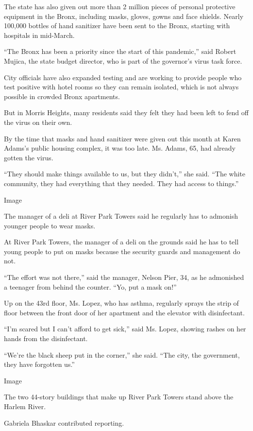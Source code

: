 The state has also given out more than 2 million pieces of personal
protective equipment in the Bronx, including masks, gloves, gowns and
face shields. Nearly 100,000 bottles of hand sanitizer have been sent to
the Bronx, starting with hospitals in mid-March.

``The Bronx has been a priority since the start of this pandemic,'' said
Robert Mujica, the state budget director, who is part of the governor's
virus task force.

City officials have also expanded testing and are working to provide
people who test positive with hotel rooms so they can remain isolated,
which is not always possible in crowded Bronx apartments.

But in Morris Heights, many residents said they felt they had been left
to fend off the virus on their own.

By the time that masks and hand sanitizer were given out this month at
Karen Adams's public housing complex, it was too late. Ms. Adams, 65,
had already gotten the virus.

``They should make things available to us, but they didn't,'' she said.
``The white community, they had everything that they needed. They had
access to things.''

Image

The manager of a deli at River Park Towers said he regularly has to
admonish younger people to wear masks.

At River Park Towers, the manager of a deli on the grounds said he has
to tell young people to put on masks because the security guards and
management do not.

``The effort was not there,'' said the manager, Nelson Pier, 34, as he
admonished a teenager from behind the counter. ``Yo, put a mask on!''

Up on the 43rd floor, Ms. Lopez, who has asthma, regularly sprays the
strip of floor between the front door of her apartment and the elevator
with disinfectant.

``I'm scared but I can't afford to get sick,'' said Ms. Lopez, showing
rashes on her hands from the disinfectant.

``We're the black sheep put in the corner,'' she said. ``The city, the
government, they have forgotten us.''

Image

The two 44-story buildings that make up River Park Towers stand above
the Harlem River.~

Gabriela Bhaskar contributed reporting.

